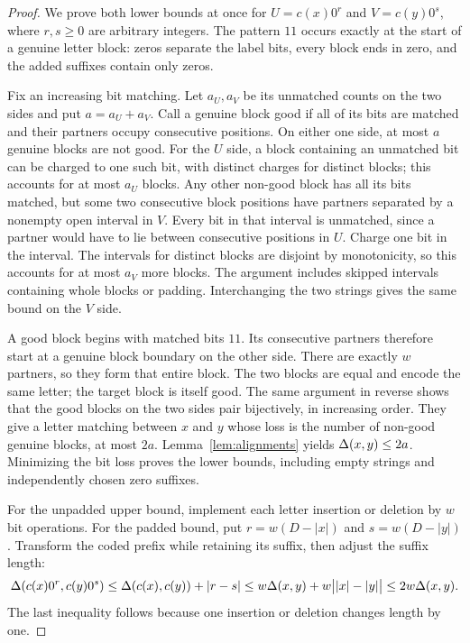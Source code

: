 \begin{proof}
We prove both lower bounds at once for
$U=c(x)0^r$ and $V=c(y)0^s$, where $r,s\ge0$ are arbitrary integers.
The pattern $11$ occurs exactly at the start of a genuine letter block:
zeros separate the label bits, every block ends in zero, and the added
suffixes contain only zeros.

Fix an increasing bit matching. Let $a_U,a_V$ be its unmatched counts
on the two sides and put $a=a_U+a_V$. Call a genuine block good if all
of its bits are matched and their partners occupy consecutive positions.
On either one side, at most $a$ genuine blocks are not good. For the
$U$ side, a block containing an unmatched bit can be charged to one
such bit, with distinct charges for distinct blocks; this accounts for
at most $a_U$ blocks. Any other non-good block has all its bits matched,
but some two consecutive block positions have partners separated by a
nonempty open interval in $V$. Every bit in that interval is unmatched,
since a partner would have to lie between consecutive positions in
$U$. Charge one bit in the interval. The intervals for distinct blocks
are disjoint by monotonicity, so this accounts for at most $a_V$ more
blocks. The argument includes skipped intervals containing whole blocks
or padding. Interchanging the two strings gives the same bound on the
$V$ side.

A good block begins with matched bits $11$. Its consecutive partners
therefore start at a genuine block boundary on the other side. There
are exactly $w$ partners, so they form that entire block. The two
blocks are equal and encode the same letter; the target block is itself
good. The same argument in reverse shows that the good blocks on the
two sides pair bijectively, in increasing order. They give a letter
matching between $x$ and $y$ whose loss is the number of non-good
genuine blocks, at most $2a$. Lemma~\ref{lem:alignments} yields
$\Delta(x,y)\le2a$. Minimizing the bit loss proves the lower bounds,
including empty strings and independently chosen zero suffixes.

For the unpadded upper bound, implement each letter insertion or
deletion by $w$ bit operations. For the padded bound, put
$r=w(D-|x|)$ and $s=w(D-|y|)$. Transform the coded prefix while
retaining its suffix, then adjust the suffix length:
\[
 \Delta(c(x)0^r,c(y)0^s)
 \le\Delta(c(x),c(y))+|r-s|
 \le w\Delta(x,y)+w\bigl||x|-|y|\bigr|
 \le2w\Delta(x,y).
\]
The last inequality follows because one insertion or deletion changes
length by one.
\end{proof}

